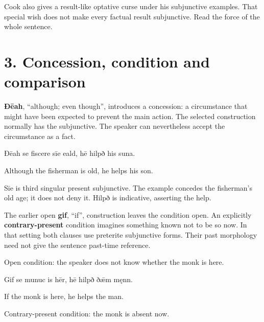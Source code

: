 Cook also gives a result-like optative curse under his subjunctive examples. That special wish does not make every factual result subjunctive. Read the force of the whole sentence.

\section*{3. Concession, condition and comparison}

\textbf{Ðēah}, “although; even though”, introduces a concession: a circumstance that might have been expected to prevent the main action. The selected construction normally has the subjunctive. The speaker can nevertheless accept the circumstance as a fact.

Ðēah se fiscere sīe eald, hē hilpð his suna.

Although the fisherman is old, he helps his son.

Sīe is third singular present subjunctive. The example concedes the fisherman’s old age; it does not deny it. Hilpð is indicative, asserting the help.

The earlier open \textbf{gif}, “if”, construction leaves the condition open. An explicitly \textbf{contrary-present} condition imagines something known not to be so now. In that setting both clauses use preterite subjunctive forms. Their past morphology need not give the sentence past-time reference.

Open condition: the speaker does not know whether the monk is here.

Gif se munuc is hēr, hē hilpð ðǣm męnn.

If the monk is here, he helps the man.

Contrary-present condition: the monk is absent now.

